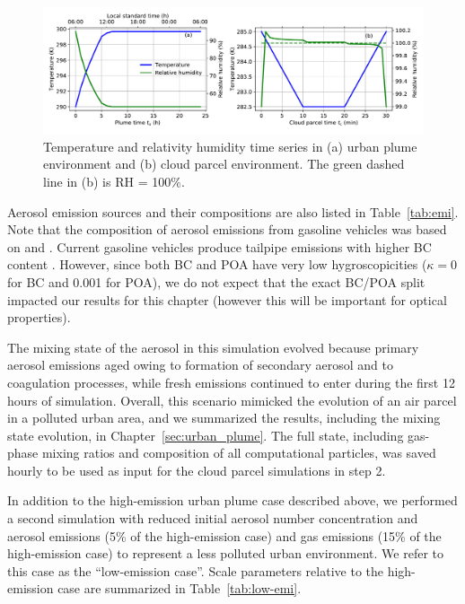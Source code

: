 \documentclass[edeposit,fullpage]{uiucthesis2009}
\begin{document}
\begin{figure}[H]
	\centering \includegraphics[width=\textwidth]{chap3_figs/fig1.pdf}
	\caption{Temperature and relativity humidity time series in (a)
		urban plume environment and (b) cloud parcel environment. The
		green dashed line in (b) is RH = 100$\%$.}
	\label{fig:env}
\end{figure}

Aerosol emission sources and their compositions are also listed in
Table~\ref{tab:emi}. Note that the composition of aerosol
  emissions from gasoline vehicles was based on
  \citet{somers2004mobile} and \citet{nam2008analysis}. Current
  gasoline vehicles produce tailpipe emissions with higher BC content
  \citep{liggio2012emissions}. However, since both BC and POA have very
  low hygroscopicities ($\kappa=0$ for BC and 0.001 for POA), we do
  not expect that the exact BC/POA split impacted our results for this
  chapter (however this will be important for optical properties).

The mixing state of the aerosol in this simulation evolved because
primary aerosol emissions aged owing to formation of secondary aerosol
and to coagulation processes, while fresh emissions continued to enter
during the first 12 hours of simulation. Overall, this scenario
mimicked the evolution of an air parcel in a polluted urban area, and
we summarized the results, including the mixing state evolution, in
Chapter~\ref{sec:urban_plume}. The full state, including gas-phase
mixing ratios and composition of all computational particles, was
saved hourly to be used as input for the cloud parcel simulations in
step 2.

In addition to the high-emission urban plume case described
  above, we performed a second simulation with reduced initial aerosol
  number concentration and aerosol emissions (5\% of the high-emission
  case) and gas emissions (15\% of the high-emission case) to
  represent a less polluted urban environment. We refer to this case
  as the ``low-emission case''.  Scale parameters relative to the
  high-emission case are summarized in Table~\ref{tab:low-emi}.
\end{document}
